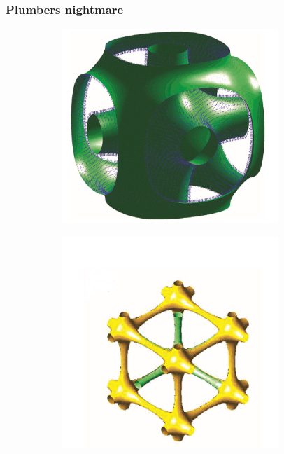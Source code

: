 \documentclass{beamer} %
\begin{document}
\begin{frame}
\frametitle{Plumbers nightmare}
\begin{figure}[H]
\centering
\begin{subfigure}[c]{0.45\textwidth}
\centering
\includegraphics[width = 0.9\textwidth]{PlumbersNightmare1.JPG}
\end{subfigure}
\begin{subfigure}[c]{0.45\textwidth}
\centering
\includegraphics[width = 0.9\textwidth]{PlumbersNightmare2.JPG}
\end{subfigure}
\end{figure}

\end{frame}

\tiny



\begin{frame}
\cite{DocGrundlagen}
\cite{MolKueche}
\cite{Schokolade}
\cite{RatselKochkunst}
\cite{Ultraschall}
\cite{Droppletsplitting}
\cite{Turbulentdroppletsplit}
\cite{KeramikmembranEM}
\cite{Keramikmembran}
\cite{inst}
\cite{owwo}
\cite{wat}
\cite{fat}

\end{frame}
\end{document}
